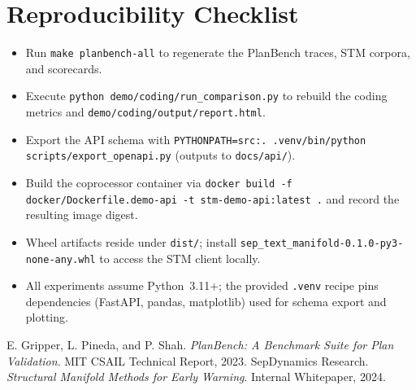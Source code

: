 \documentclass[11pt]{article}
\begin{document}
\section{Reproducibility Checklist}
\begin{itemize}
  \item Run \texttt{make planbench-all} to regenerate the PlanBench traces, STM corpora, and scorecards.
  \item Execute \texttt{python demo/coding/run\_comparison.py} to rebuild the coding metrics and \texttt{demo/coding/output/report.html}.
  \item Export the API schema with \texttt{PYTHONPATH=src:. .venv/bin/python scripts/export\_openapi.py} (outputs to \texttt{docs/api/}).
  \item Build the coprocessor container via \texttt{docker build -f docker/Dockerfile.demo-api -t stm-demo-api:latest .} and record the resulting image digest.
  \item Wheel artifacts reside under \texttt{dist/}; install \texttt{sep\_text\_manifold-0.1.0-py3-none-any.whl} to access the STM client locally.
  \item All experiments assume Python~3.11+; the provided \texttt{.venv} recipe pins dependencies (FastAPI, pandas, matplotlib) used for schema export and plotting.
\end{itemize}

\begin{thebibliography}{9}
 E. Gripper, L. Pineda, and P. Shah. \emph{PlanBench: A Benchmark Suite for Plan Validation}. MIT CSAIL Technical Report, 2023.
 SepDynamics Research. \emph{Structural Manifold Methods for Early Warning}. Internal Whitepaper, 2024.
\end{thebibliography}
\end{document}
